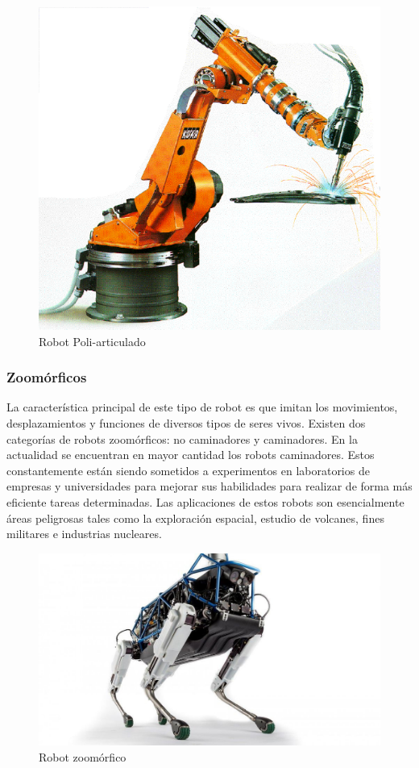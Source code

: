         \begin{figure}[htb]
            \centering
            \includegraphics[width=0.4\linewidth]{Main/Chapter2/Images2/Robot-poliarticulado.png}
            \caption{Robot Poli-articulado}
            \label{f:Cap2_general_6}
        \end{figure}
        
        \subsubsection{Zoomórficos}
        La característica principal de este tipo de robot es que imitan los movimientos, desplazamientos y funciones de diversos tipos de seres vivos. Existen dos categorías de robots zoomórficos: no caminadores y caminadores. En la actualidad se encuentran en mayor cantidad los robots caminadores. Estos constantemente están siendo sometidos a experimentos en laboratorios de empresas y universidades para mejorar sus habilidades para realizar de forma más eficiente tareas determinadas. Las aplicaciones de estos robots son esencialmente áreas peligrosas tales como la exploración espacial, estudio de volcanes, fines militares e industrias nucleares. 
        
        \begin{figure}[htb]
            \centering
            \includegraphics[width=0.5\linewidth]{Main/Chapter2/Images2/Robot-Zoomorico.jpg}
            \caption{Robot zoomórfico}
            \label{f:Cap2_general_7}
        \end{figure}
        
        \newpage
        
